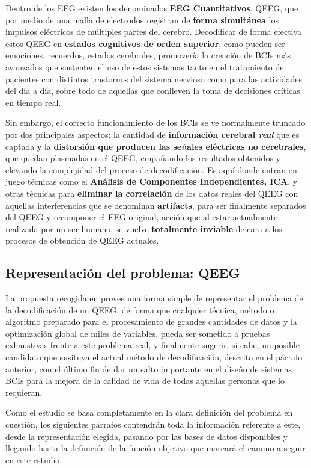 Dentro de los EEG existen los denominados \textbf{EEG Cuantitativos}, QEEG\cite{QEEG}, que por medio de una malla de electrodos registran de \textbf{forma simultánea} los impulsos eléctricos de múltiples partes del cerebro. Decodificar de forma efectiva estos QEEG en \textbf{estados cognitivos de orden superior}\cite{EvolutionaryBigOpt}, como pueden ser emociones, recuerdos, estados cerebrales, promovería la creación de BCIs más avanzados que sustenten el uso de estos sistemas tanto en el tratamiento de pacientes con distintos trastornos del sistema nervioso como para las actividades del día a día, sobre todo de aquellas que conlleven la toma de decisiones críticas en tiempo real.

Sin embargo, el correcto funcionamiento de los BCIs se ve normalmente truncado por dos principales aspectos: la cantidad de \textbf{información cerebral \textit{real}} que es captada y la \textbf{distorsión que producen las señales eléctricas no cerebrales}, que quedan plasmadas en el QEEG, empañando los resultados obtenidos y elevando la complejidad del proceso de decodificación. Es aquí donde entran en juego técnicas como el \textbf{Análisis de Componentes Independientes, ICA}, y otras técnicas para \textbf{eliminar la correlación} de los datos reales del QEEG con aquellas interferencias que se denominan \textbf{artifacts}, para ser finalmente separados del QEEG y recomponer el EEG original, acción que al estar actualmente realizada por un ser humano, se vuelve \textbf{totalmente inviable} de cara a los procesos de obtención de QEEG actuales.

\subsection{Representación del problema: QEEG}

La propuesta recogida en\cite{EvolutionaryBigOpt} provee una forma simple de representar el problema de la decodificación de un QEEG, de forma que cualquier técnica, método o algoritmo preparado para el procesamiento de grandes cantidades de datos y la optimización global de miles de variables, pueda ser sometido a pruebas exhaustivas frente a este problema real, y finalmente sugerir, si cabe, un posible candidato que susituya el actual método de decodificación, descrito en el párrafo anterior, con el último fin de dar un salto importante en el diseño de sistemas BCIs para la mejora de la calidad de vida de todas aquellas personas que lo requieran.

Como el estudio se basa completamente en la clara definición del problema en cuestión, los siguientes párrafos contendrán toda la información referente a éste, desde la representación elegida, pasando por las bases de datos disponibles y llegando hasta la definición de la función objetivo que marcará el camino a seguir en este estudio.















